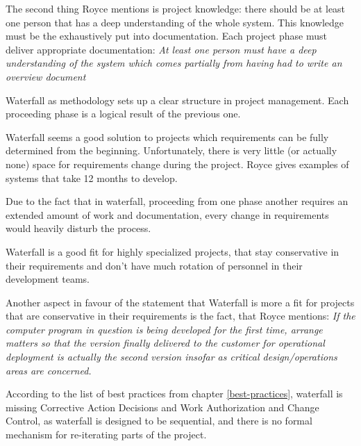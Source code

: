 The second thing Royce mentions is project knowledge: there should be at least one person that has a deep understanding of the whole system. This knowledge must be the exhaustively put into documentation. Each project phase must deliver appropriate documentation: \emph{At least one person must have a deep understanding of the system which comes partially from having had to write an overview document}\cite{Royce1970}

Waterfall as methodology sets up a clear structure in project
management. Each proceeding phase is a logical result of the previous
one.

Waterfall seems a good solution to projects which requirements can be fully determined from the beginning. Unfortunately, there is very little (or actually none) space for requirements change during the project. Royce gives examples of systems that take 12 months to develop.

Due to the fact that in waterfall, proceeding from one phase another
requires an extended amount of work and documentation, every change in
requirements would heavily disturb the process.

Waterfall is a good fit for highly specialized projects, that stay conservative in their requirements and don't have much rotation of personnel in their development teams. 

Another aspect in favour of the statement that Waterfall is more a fit for projects that are conservative in their requirements is the fact, that Royce mentions: \emph{If the computer program in question is being developed for the first time, arrange
matters so that the version finally delivered to the customer for operational deployment is actually the second
version insofar as critical design/operations areas are concerned.}\cite{Royce1970}

According to the list of best practices from chapter \ref{best-practices}, waterfall is missing Corrective Action Decisions and Work Authorization and Change Control, as waterfall is designed to be sequential, and there is no formal mechanism for re-iterating parts of the project.  

